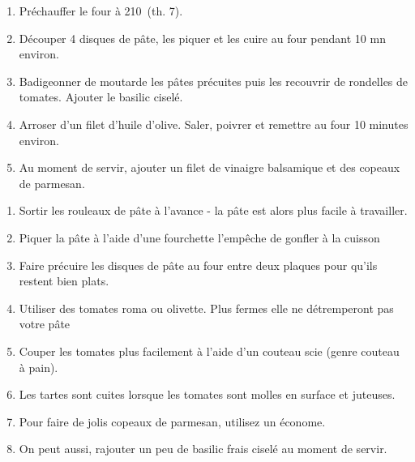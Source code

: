
\begin{ingredients}
\end{ingredients}


\begin{recipe}
  \begin{enumerate}

  \item Pr\'echauffer le four \`a 210\degreeC\ (th. 7).

  \item D\'ecouper 4 disques de p\^ate, les piquer et les cuire au
    four pendant 10 mn environ.

  \item Badigeonner de moutarde les p\^ates pr\'ecuites puis les
    recouvrir de rondelles de tomates. Ajouter le basilic cisel\'e.


  \item Arroser d'un filet d'huile d'olive. Saler, poivrer et remettre
    au four 10 minutes environ.

  \item Au moment de servir, ajouter un filet de vinaigre balsamique
    et des copeaux de parmesan.

  \end{enumerate}

\end{recipe}

\begin{enumerate}

\item Sortir les rouleaux de p\^ate \`a l'avance - la p\^ate est alors
  plus facile \`a travailler.

\item Piquer la p\^ate \`a l'aide d'une fourchette l'empêche de
  gonfler \`a la cuisson

\item Faire pr\'ecuire les disques de p\^ate au four entre deux
  plaques pour qu'ils restent bien plats.

\item Utiliser des tomates roma ou olivette. Plus fermes
  elle ne d\'etremperont pas votre p\^ate

\item Couper les tomates plus facilement \`a l'aide d'un couteau scie
  (genre couteau \`a pain).

\item Les tartes sont cuites lorsque les tomates sont molles en
  surface et juteuses.

\item Pour faire de jolis copeaux de parmesan, utilisez un
  \'econome.

\item On peut aussi, rajouter un peu de basilic frais cisel\'e au
  moment de servir.

\end{enumerate}